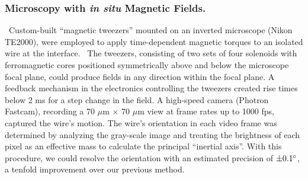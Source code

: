 \subsubsection{Microscopy with \textit{in situ} Magnetic Fields.}~Custom-built ``magnetic tweezers'' mounted on an inverted microscope (Nikon TE2000), were employed to apply time-dependent magnetic torques to an isolated wire at the interface.~\cite{Lee2009} The tweezers, consisting of two sets of four solenoids with ferromagnetic cores positioned symmetrically above and below the microscope focal plane, could produce fields in any direction within the focal plane.  A feedback mechanism in the electronics controlling the tweezers created rise times below 2 ms for a step change in the field.  A high-speed camera (Photron Fastcam), recording a 70 $\mu$m $\times$ 70 $\mu$m view at frame rates up to 1000 fps, captured the wire's motion.  The wire's orientation in each video frame was determined by analyzing the gray-scale image and treating the brightness of each pixel as an effective mass to calculate the principal ``inertial axis''.  With this procedure, we could resolve the orientation with an estimated precision of $\pm 0.1^\circ$, a tenfold improvement over our previous method.~\cite{Lee2010} 
%


